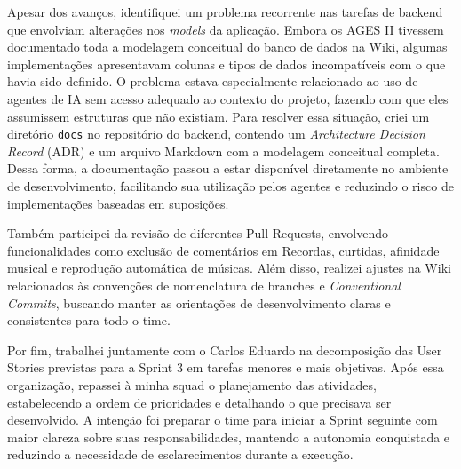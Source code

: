 \indent Apesar dos avanços, identifiquei um problema recorrente nas tarefas de backend que envolviam alterações nos \textit{models} da aplicação. Embora os AGES II tivessem documentado toda a modelagem conceitual do banco de dados na Wiki, algumas implementações apresentavam colunas e tipos de dados incompatíveis com o que havia sido definido. O problema estava especialmente relacionado ao uso de agentes de IA sem acesso adequado ao contexto do projeto, fazendo com que eles assumissem estruturas que não existiam. Para resolver essa situação, criei um diretório \texttt{docs} no repositório do backend, contendo um \textit{Architecture Decision Record} (ADR) e um arquivo Markdown com a modelagem conceitual completa. Dessa forma, a documentação passou a estar disponível diretamente no ambiente de desenvolvimento, facilitando sua utilização pelos agentes e reduzindo o risco de implementações baseadas em suposições.\par

\indent Também participei da revisão de diferentes Pull Requests, envolvendo funcionalidades como exclusão de comentários em Recordas, curtidas, afinidade musical e reprodução automática de músicas. Além disso, realizei ajustes na Wiki relacionados às convenções de nomenclatura de branches e \textit{Conventional Commits}, buscando manter as orientações de desenvolvimento claras e consistentes para todo o time.\par

\indent Por fim, trabalhei juntamente com o Carlos Eduardo na decomposição das User Stories previstas para a Sprint 3 em tarefas menores e mais objetivas. Após essa organização, repassei à minha squad o planejamento das atividades, estabelecendo a ordem de prioridades e detalhando o que precisava ser desenvolvido. A intenção foi preparar o time para iniciar a Sprint seguinte com maior clareza sobre suas responsabilidades, mantendo a autonomia conquistada e reduzindo a necessidade de esclarecimentos durante a execução.\par

